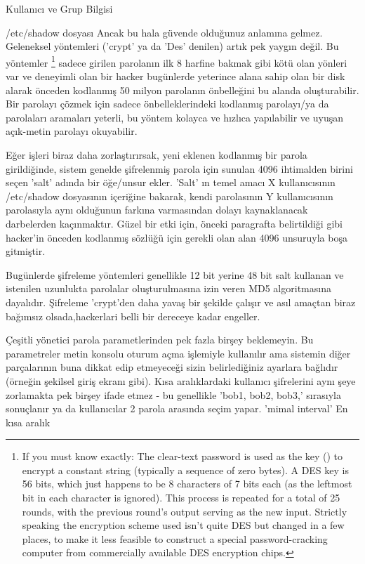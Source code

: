 \begin{section}{Kullanıcı ve Grup Bilgisi}
\begin{subsection}{/etc/shadow dosyası}
Ancak bu hala güvende olduğunuz anlamına gelmez. Geleneksel yöntemleri ('crypt' ya da 'Des' denilen) artık pek yaygın değil. Bu yöntemler
\footnote{If you must know exactly: The clear-text password is used as the key (\!) to encrypt a constant string (typically a sequence of zero bytes). A DES key is 56 bits, which just happens to be 8 characters of 7 bits each (as the leftmost bit in each character is ignored). This process is repeated for a total of 25 rounds, with the previous round’s output serving as the new input. Strictly speaking the encryption scheme used isn’t quite DES but changed in a few places, to make it less feasible to construct a special password-cracking computer from commercially available DES encryption chips.} sadece girilen parolanın ilk 8 harfine bakmak gibi kötü olan yönleri var ve deneyimli olan bir hacker bugünlerde yeterince alana sahip olan bir disk alarak önceden kodlanmış 50 milyon parolanın önbelleğini bu alanda oluşturabilir. Bir parolayı çözmek için sadece önbelleklerindeki kodlanmış parolayı/ya da parolaları aramaları yeterli, bu yöntem kolayca ve hızlıca yapılabilir ve uyuşan açık-metin parolayı okuyabilir.

Eğer işleri biraz daha zorlaştırırsak, yeni eklenen kodlanmış bir parola girildiğinde, sistem genelde şifrelenmiş parola için sunulan 4096 ihtimalden birini seçen 'salt' adında bir öğe/unsur ekler. 'Salt' ın temel amacı X kullanıcısının /etc/shadow dosyasının içeriğine bakarak, kendi parolasının Y kullanıcısının parolasıyla aynı olduğunun farkına varmasından dolayı kaynaklanacak darbelerden kaçınmaktır. Güzel bir etki için, önceki paragrafta belirtildiği gibi hacker'in önceden kodlanmış sözlüğü için gerekli olan alan 4096 unsuruyla boşa gitmiştir.

Bugünlerde şifreleme yöntemleri genellikle 12 bit yerine 48 bit salt kullanan ve istenilen uzunlukta parolalar oluşturulmasına izin veren MD5 algoritmasına dayalıdır. Şifreleme 'crypt'den daha yavaş bir şekilde çalışır ve asıl amaçtan biraz bağımsız olsada,hackerlari belli bir dereceye kadar engeller.

Çeşitli yönetici parola parametlerinden pek fazla birşey beklemeyin. Bu parametreler metin konsolu oturum açma işlemiyle kullanılır ama sistemin diğer parçalarının buna dikkat edip etmeyeceği sizin belirlediğiniz ayarlara bağlıdır (örneğin şekilsel giriş ekranı gibi). Kısa aralıklardaki kullanıcı şifrelerini aynı şeye zorlamakta pek birşey ifade etmez - bu genellikle 'bob1, bob2, bob3,' sırasıyla sonuçlanır ya da kullanıcılar 2 parola arasında seçim yapar. 'mimal interval' En kısa aralık



\end{subsection}
\end{section}
